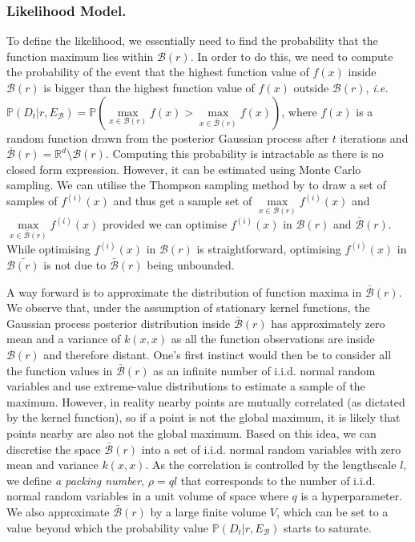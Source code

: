 \documentclass[preprint]{elsarticle}
\begin{document}

\subsubsection{Likelihood Model.}
To define the likelihood, we essentially need to find the probability that the function maximum lies within $\mathcal{B}(r)$. In order to do this, we need to compute the probability of the event that the highest function value of $f(x)$ inside $\mathcal{B}(r)$ is bigger than the highest function value of $f(x)$ outside $\mathcal{B}(r)$, \emph{i.e.} $\mathbb{P}(D_t|r,E_{\mathcal{B}})=\mathbb{P}(\underset{x\in \mathcal{B}(r)}{\max}f(x)>\underset{{x\in \bar{\mathcal{B}}(r)}}{\max}f(x))$, where $f(x)$ is a random function drawn from the posterior Gaussian process after $t$ iterations and $\mathcal{\bar{B}}(r)=\mathbb{R}^d\setminus\mathcal{B}(r)$. Computing this probability is intractable as there is no closed form expression. However, it can be estimated using Monte Carlo sampling. We can utilise the Thompson sampling method by \cite{hernandez2014predictive} to draw a set of samples of ${f^{(i)}(x)}$ and thus get a sample set of ${\underset{x\in \mathcal{B}(r)}{\max}f^{(i)}(x)}$ and  ${\underset{{x\in \bar{\mathcal{B}}(r)}}{\max}f^{(i)}(x)}$ provided we can optimise $f^{(i)}(x)$ in $\mathcal{B}(r)$ and $\bar{\mathcal{B}}(r)$. While optimising $f^{(i)}(x)$ in $\mathcal{B}(r)$ is straightforward, optimising $f^{(i)}(x)$ in $\bar{\mathcal{B}(r)}$ is not due to $\bar{\mathcal{B}}(r)$ being unbounded. 

A way forward is to approximate the distribution of function maxima in $\bar{\mathcal{B}}(r)$.  We observe that, under the assumption of stationary kernel functions, the Gaussian process posterior distribution inside $\bar{\mathcal{B}}(r)$ has approximately zero mean and a variance of $k(x,x)$ as all the function observations are inside $\mathcal{B}(r)$ and therefore  distant. One's first instinct would then be to consider all the function values in $\bar{\mathcal{B}}(r)$ as an infinite number of i.i.d. normal random variables and use extreme-value distributions to estimate a sample of the maximum. However, in reality nearby points are mutually correlated (as dictated by the kernel function), so if a point is not the global maximum, it is likely that points nearby are also not the global maximum. Based on this idea, we can discretise the space $\bar{\mathcal{B}}(r)$ into a set of i.i.d. normal random variables with zero mean and variance $k(x,x)$. As the correlation is controlled by the lengthscale $l$, we define \emph{a packing number}, $\rho=q l$ that corresponds to the number of i.i.d. normal random variables in a unit volume of space where $q$ is a hyperparameter. We also approximate $\bar{\mathcal{B}}(r)$ by a large finite volume $V$, which can be set to a value beyond which the probability value $\mathbb{P}(D_t|r,E_{\mathcal{B}})$ starts to saturate.
\end{document}
